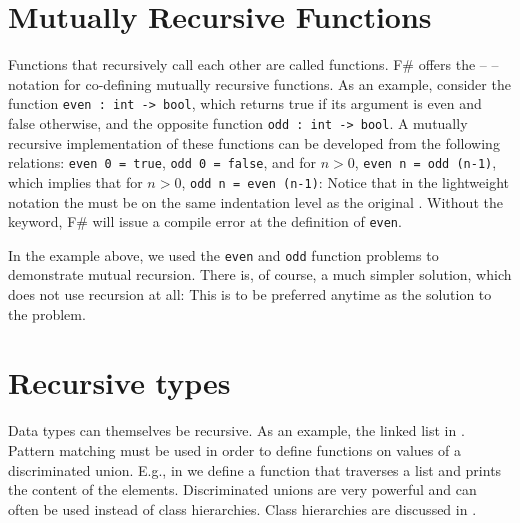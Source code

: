 \documentclass[fsharpNotes.tex]{subfiles}
\begin{document}
\section{Mutually Recursive Functions}
Functions that recursively call each other are called  functions. F\# offers the  --  --  notation for co-defining mutually recursive functions. As an example, consider the function \mbox{\lstinline!even : int -> bool!}, which returns true if its argument is even and false otherwise, and the opposite function \mbox{\lstinline!odd : int -> bool!}. A mutually recursive implementation of these functions can be developed from the following relations: \mbox{\lstinline!even 0 = true!}, \mbox{\lstinline!odd 0 = false!}, and for $n>0$, \mbox{\lstinline!even n = odd (n-1)!}, which implies that for $n>0$, \mbox{\lstinline!odd n = even (n-1)!}:
%
%
Notice that in the lightweight notation the  must be on the same indentation level as the original . Without the  keyword, F\# will issue a compile error at the definition of \lstinline!even!.

In the example above, we used the \lstinline!even! and \lstinline!odd! function problems to demonstrate mutual recursion. There is, of course, a much simpler solution, which does not use recursion at all:
%
%
This is to be preferred anytime as the solution to the problem. 

\section{Recursive types}
Data types can themselves be recursive. As an example, the linked list in .
%
%
Pattern matching must be used in order to define functions on values of a discriminated union. E.g., in  we define a function that traverses a list and prints the content of the elements.
%
%
Discriminated unions are very powerful and can often be used instead of class hierarchies. Class hierarchies are discussed in .
\end{document}
